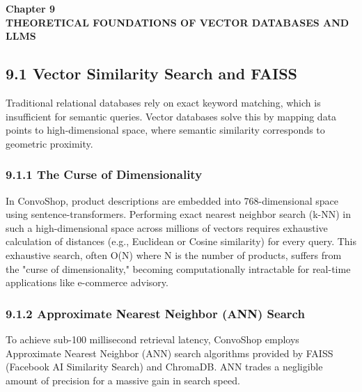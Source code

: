 \newpage
\begin{center}
{\fontsize{14}{17}\bfseries Chapter 9\\[6pt]}
{\fontsize{16}{20}\bfseries THEORETICAL FOUNDATIONS OF VECTOR DATABASES AND LLMS\\[10pt]}
\end{center}

\subsection*{9.1 Vector Similarity Search and FAISS}
Traditional relational databases rely on exact keyword matching, which is insufficient for semantic queries. Vector databases solve this by mapping data points to high-dimensional space, where semantic similarity corresponds to geometric proximity.

\subsubsection*{9.1.1 The Curse of Dimensionality}
In ConvoShop, product descriptions are embedded into 768-dimensional space using sentence-transformers. Performing exact nearest neighbor search (k-NN) in such a high-dimensional space across millions of vectors requires exhaustive calculation of distances (e.g., Euclidean or Cosine similarity) for every query. This exhaustive search, often O(N) where N is the number of products, suffers from the "curse of dimensionality," becoming computationally intractable for real-time applications like e-commerce advisory.

\subsubsection*{9.1.2 Approximate Nearest Neighbor (ANN) Search}
To achieve sub-100 millisecond retrieval latency, ConvoShop employs Approximate Nearest Neighbor (ANN) search algorithms provided by FAISS (Facebook AI Similarity Search) and ChromaDB. ANN trades a negligible amount of precision for a massive gain in search speed. 

